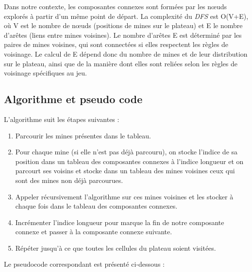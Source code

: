 \documentclass[a4paper,12pt]{report}
\begin{document}
Dans notre contexte, les composantes connexes sont formées par les nœuds explorés à partir d'un même point de départ. La complexité du \textit{DFS} est 
O(V+E), où V est le nombre de nœuds (positions de mines sur le plateau) et E le nombre d'arêtes (liens entre mines voisines). Le nombre d'arêtes 
E est déterminé par les paires de mines voisines, qui sont connectées si elles respectent les règles de voisinage. Le calcul de E dépend donc du nombre 
de mines et de leur distribution sur le plateau, ainsi que de la manière dont elles sont reliées selon les règles de voisinage spécifiques au jeu.

\subsection{Algorithme et pseudo code}

L'algorithme suit les étapes suivantes :

\begin{enumerate}
    \item Parcourir les mines présentes dans le tableau.
    \item Pour chaque mine (si elle n'est pas déjà parcouru), on stocke l'indice de sa position dans un tableau des composantes connexes à l'indice longueur 
    et on parcourt ses voisins et stocke dans un tableau des mines voisines ceux qui sont des mines non déjà parcourues.
    \item Appeler récursivement l'algorithme sur ces mines voisines et les stocker à chaque fois dans le tableau des composantes connexes.
    \item Incrémenter l'indice longueur pour marque la fin de notre composante connexe et passer à la composante connexe suivante.
    \item Répéter jusqu'à ce que toutes les cellules du plateau soient visitées.
\end{enumerate}

Le pseudocode correspondant est présenté ci-dessous : 
\end{document}
